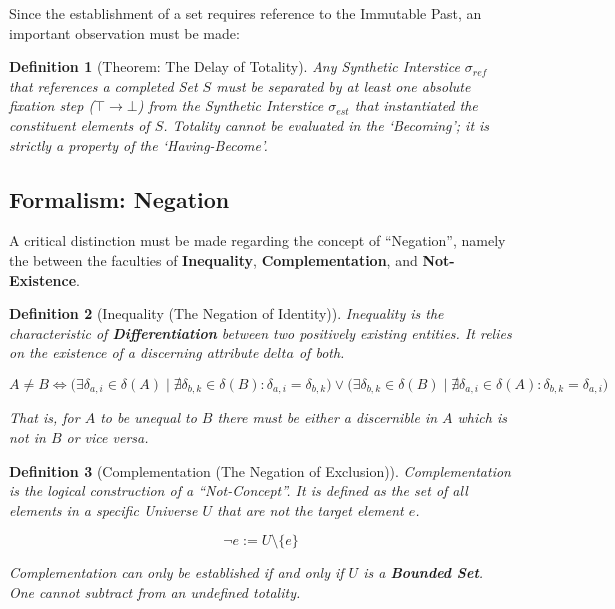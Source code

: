 \documentclass[11pt, a4paper]{article}
\theoremstyle{formalism}
\newtheorem{formalism}{Definition}
\begin{document}
Since the establishment of a set requires reference to the Immutable Past, an
important observation must be made:

\begin{formalism}[Theorem: The Delay of Totality]
    Any Synthetic Interstice $\sigma_{ref}$ that references a
    completed Set $S$ must be separated by at least one absolute fixation step
    ($\top \to \bot$) from the Synthetic Interstice $\sigma_{est}$ that
    instantiated the constituent elements of $S$. Totality cannot be evaluated
    in the `Becoming'; it is strictly a property of the `Having-Become'.
\end{formalism}

\subsection{Formalism: Negation}

A critical distinction must be made regarding the concept of ``Negation'', namely 
the between the faculties of \textbf{Inequality}, \textbf{Complementation}, and
\textbf{Not-Existence}.

\begin{formalism}[Inequality (The Negation of Identity)]
    Inequality is the characteristic of \textbf{Differentiation} between two positively 
    existing entities. It relies on the existence of a discerning attribute $delta$
    of both. 
    
    \begin{equation}
        A \neq B \iff \Big( \exists \delta_{a,i} \in \delta(A) \mid \nexists \delta_{b,k} \in \delta(B) : \delta_{a,i} = \delta_{b,k} \Big) \lor \Big( \exists \delta_{b,k} \in \delta(B) \mid \nexists \delta_{a,i} \in \delta(A) : \delta_{b,k} = \delta_{a,i} \Big)
    \end{equation}

    That is, for $A$ to be unequal to $B$ there must be either a discernible 
    in $A$ which is not in $B$ or vice versa.

\end{formalism}

\begin{formalism}[Complementation (The Negation of Exclusion)]
    Complementation is the logical construction of a ``Not-Concept''. It is
    defined as the set of all elements in a specific Universe $U$ that are not
    the target element $e$.
    
    \begin{equation}
        \neg e := U \setminus \{e\}
    \end{equation}
    
    Complementation can only be established if and only if $U$ is a
    \textbf{Bounded Set}. One cannot subtract from an undefined totality.
\end{formalism}
\end{document}
